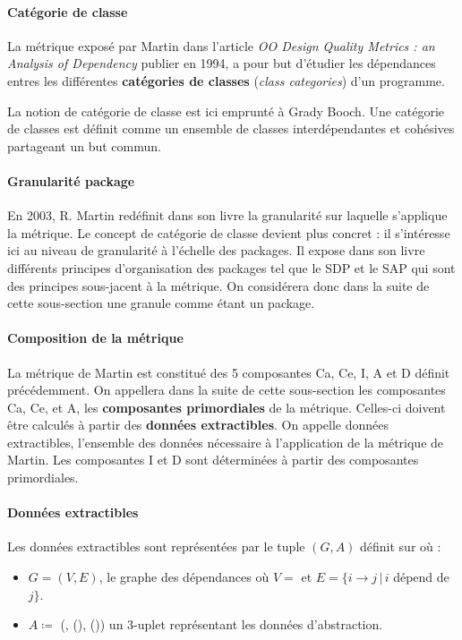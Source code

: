 \documentclass{scrartcl}
\begin{document}
    \paragraph{Catégorie de classe}La métrique exposé par Martin dans l'article \textit{OO Design Quality Metrics : an Analysis of Dependency}\cite{Martin:1994} publier en 1994, a pour but d'étudier les dépendances entres les différentes \textbf{catégories de classes} (\emph{class categories}) d'un programme. 
    
    La notion de catégorie de classe est ici emprunté à Grady Booch\cite{Booch:1991}. Une catégorie de classes est définit comme un ensemble de classes interdépendantes et cohésives partageant un but commun.
    
    \paragraph{Granularité package}En 2003, R. Martin redéfinit dans son livre\cite{Martin:2003} la granularité sur laquelle s'applique la métrique. Le concept de catégorie de classe devient plus concret : il s'intéresse ici au niveau de granularité à l'échelle des packages. Il expose dans son livre différents principes d'organisation des packages tel que le SDP et le SAP qui sont des principes sous-jacent à la métrique. On considérera donc dans la suite de cette sous-section une granule comme étant un package.



    \paragraph{Composition de la métrique}La métrique de Martin est constitué des 5 composantes Ca, Ce, I, A et D définit précédemment. On appellera dans la suite de cette sous-section les composantes Ca, Ce, et A, les \textbf{composantes primordiales} de la métrique. Celles-ci doivent être calculés à partir des \textbf{données extractibles}. On appelle données extractibles, l'ensemble des données nécessaire à l'application de la métrique de Martin. Les composantes I et D sont déterminées à partir des composantes primordiales.
    
    \paragraph{Données extractibles}Les données extractibles sont représentées par le tuple $(G, A)$ définit sur \granuleUniverse{} où :
    \begin{itemize}
        \item $G = (V, E)$, le graphe des dépendances où $V = $ \granuleUniverse{} et $E = \{i \to j \, | \, i $ dépend de $j\}$.
        \item $A \coloneqq$ (\granule{}, \numberOfClass{}(\granule{}), \numberOfabstractClass{}(\granule{})) un 3-uplet représentant les données d'abstraction.
    \end{itemize}
    
\end{document}
